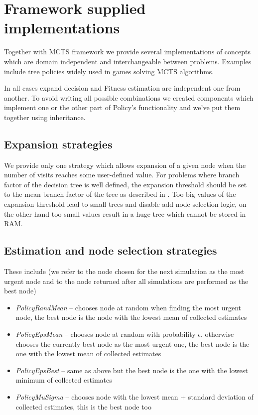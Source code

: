 \section{Framework supplied implementations}

Together with MCTS framework we provide several implementations of concepts
which are domain independent and interchangeable between problems. Examples
include tree policies widely used in games solving MCTS algorithms.

In all cases expand decision and Fitness estimation are independent one from
another. To avoid writing all possible combinations we created components which
implement one or the other part of Policy's functionality and we've put them
together using inheritance.

\subsection{Expansion strategies}

We provide only one strategy which allows expansion of a given node when the
number of visits reaches some user-defined value. For problems where branch
factor of the decision tree is well defined, the expansion threshold should be
set to the mean branch factor of the tree as described in \cite{Pawlewicz}.
Too big values of the expansion threshold lead to small trees and disable add
node selection logic, on the other hand too small values result in a huge tree
which cannot be stored in RAM.

\subsection{Estimation and node selection strategies}

These include (we refer to the node chosen for the next simulation as the most
urgent node and to the node returned after all simulations are performed as the
best node)
\begin{itemize}
  \item \emph{PolicyRandMean} -- chooses node at random when finding the most
    urgent node, the best node is the node with the lowest mean of collected
    estimates
  \item \emph{PolicyEpsMean} -- chooses node at random with probability
    $\epsilon$, otherwise chooses the currently best node as the most urgent
    one, the best node is the one with the lowest mean of collected estimates
  \item \emph{PolicyEpsBest} -- same as above but the best node is the one with the
    lowest minimum of collected estimates
  \item \emph{PolicyMuSigma} -- chooses node with the lowest mean + standard
    deviation of collected estimates, this is the best node too
\end{itemize}

